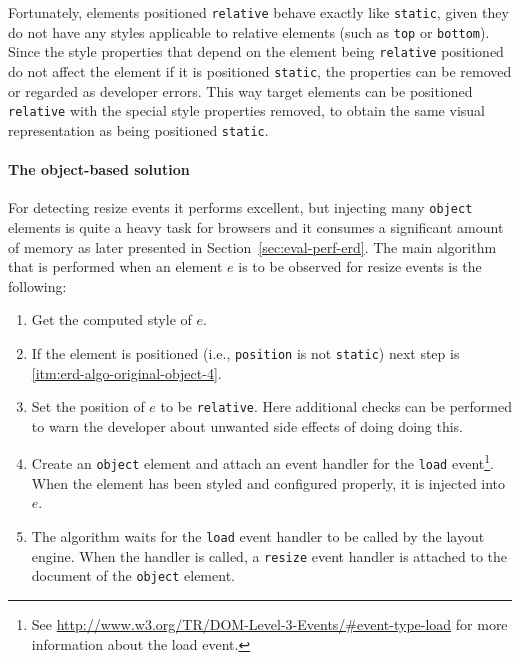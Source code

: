 \documentclass[a4paper,11pt]{kth-mag}
\newcommand{\code}[1]{\texttt{#1}}
\begin{document}
\begin{itemize}
            Fortunately, \glspl{element} positioned \code{relative} behave exactly like \code{static}, given they do not have any styles applicable to relative \glspl{element} (such as \code{top} or \code{bottom}).
            Since the style properties that depend on the \gls{element} being \code{relative} positioned do not affect the \gls{element} if it is positioned \code{static}, the properties can be removed or regarded as developer errors.
            This way target \glspl{element} can be positioned \code{relative} with the special style properties removed, to obtain the same visual representation as being positioned \code{static}.
        \end{itemize}

        \paragraph{The object-based solution}
        For detecting resize events it performs excellent, but injecting many \code{object} \glspl{element} is quite a heavy task for \glspl{browser} and it consumes a significant amount of memory as later presented in Section~\ref{sec:eval-perf-erd}.
        The main algorithm that is performed when an element $e$ is to be observed for resize events is the following:
        \begin{enumerate}
          \item\label{itm:erd-algo-original-object-1} Get the computed style of $e$.
          \item                                       If the element is positioned (i.e., \code{position} is not \code{static}) next step is \ref{itm:erd-algo-original-object-4}.
          \item\label{itm:erd-algo-original-object-3} Set the position of $e$ to be \code{relative}. Here additional checks can be performed to warn the developer about unwanted side effects of doing doing this.
          \item\label{itm:erd-algo-original-object-4} Create an \code{object} element and attach an event handler for the \code{load} event\footnote{See \url{http://www.w3.org/TR/DOM-Level-3-Events/\#event-type-load} for more information about the load event.}. When the element has been styled and configured properly, it is injected into $e$.
          \item                                       The algorithm waits for the \code{load} event handler to be called by the \gls{layout engine}. When the handler is called, a \code{resize} event handler is attached to the \gls{document} of the \code{object} \gls{element}.
        \end{enumerate}
\end{document}
